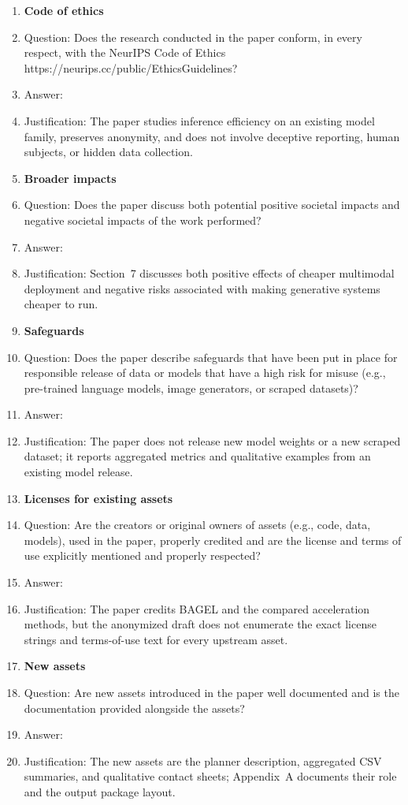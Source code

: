 \begin{enumerate}[leftmargin=*]
\item \textbf{Code of ethics}
\item[] Question: Does the research conducted in the paper conform, in every respect, with the NeurIPS Code of Ethics https://neurips.cc/public/EthicsGuidelines?
\item[] Answer: \answerYes{}
\item[] Justification: The paper studies inference efficiency on an existing model family, preserves anonymity, and does not involve deceptive reporting, human subjects, or hidden data collection.

\item \textbf{Broader impacts}
\item[] Question: Does the paper discuss both potential positive societal impacts and negative societal impacts of the work performed?
\item[] Answer: \answerYes{}
\item[] Justification: Section~7 discusses both positive effects of cheaper multimodal deployment and negative risks associated with making generative systems cheaper to run.

\item \textbf{Safeguards}
\item[] Question: Does the paper describe safeguards that have been put in place for responsible release of data or models that have a high risk for misuse (e.g., pre-trained language models, image generators, or scraped datasets)?
\item[] Answer: \answerNA{}
\item[] Justification: The paper does not release new model weights or a new scraped dataset; it reports aggregated metrics and qualitative examples from an existing model release.

\item \textbf{Licenses for existing assets}
\item[] Question: Are the creators or original owners of assets (e.g., code, data, models), used in the paper, properly credited and are the license and terms of use explicitly mentioned and properly respected?
\item[] Answer: \answerNo{}
\item[] Justification: The paper credits BAGEL and the compared acceleration methods, but the anonymized draft does not enumerate the exact license strings and terms-of-use text for every upstream asset.

\item \textbf{New assets}
\item[] Question: Are new assets introduced in the paper well documented and is the documentation provided alongside the assets?
\item[] Answer: \answerYes{}
\item[] Justification: The new assets are the planner description, aggregated CSV summaries, and qualitative contact sheets; Appendix~A documents their role and the output package layout.


\end{enumerate}
